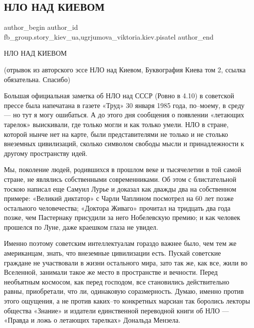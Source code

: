  
 
 
 
 
 
\subsection{НЛО НАД КИЕВОМ}
\label{sec:23_09_2020.fb.fb_group.story_kiev_ua.1.nlo_nad_kievom}
 
\ifcmt
 author_begin
   author_id fb_group.story_kiev_ua,ugrjumova_viktoria.kiev.pisatel
 author_end
\fi

НЛО НАД КИЕВОМ

(отрывок из авторского эссе НЛО над Киевом, Буквография Киева том 2, ссылка
обязательна. Спасибо)

\begin{zznagolos}
Большая официальная заметка об НЛО над СССР (Ровно в 4.10) в советской прессе
была напечатана в газете «Труд» 30 января 1985 года, по–моему, в среду — но
тут я могу ошибаться. А до этого дня сообщения о появлении «летающих тарелок»
выискивали, где только могли и как только умели. НЛО в стране, которой нынче
нет на карте, были представителями не только и не столько внеземных
цивилизаций, сколько символом свободы мысли и принадлежности к другому
пространству идей.
\end{zznagolos}

Мы, поколение людей, родившихся в прошлом веке и тысячелетии в той самой
стране, не являлись собственными современниками. Об этом с блистательной тоскою
написал еще Самуил Лурье и доказал как дважды два на собственном примере:
«Великий диктатор» с Чарли Чаплином посмотрел на 60 лет позже остального
человечества; «Доктора Живаго» прочитал на тридцать два года позже, чем
Пастернаку присудили за него Нобелевскую премию; и как человек прошелся по
Луне, даже краешком глаза не увидел.


Именно поэтому советским интеллектуалам гораздо важнее было, чем тем же
американцам, знать, что внеземные цивилизации есть. Пускай советские граждане
не участвовали в жизни остального мира, зато так же, как все, жили во
Вселенной, занимали такое же место в пространстве и вечности. Перед необъятным
космосом, как перед господом, все становились действительно равны, приобретали,
что ли, одинаковую соразмерность. Думаю, именно против этого ощущения, а не
против каких–то конкретных марсиан так боролись лекторы общества «Знание» и
издатели единственной переводной книги об НЛО — «Правда и ложь о летающих
тарелках» Дональда Мензела.

